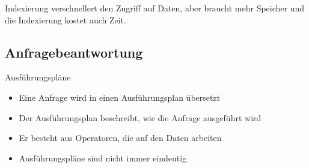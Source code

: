 \documentclass{article}
\begin{document}
Indexierung verschnellert den Zugriff auf Daten, aber braucht mehr Speicher und die Indexierung kostet auch Zeit.

\subsection*{Anfragebeantwortung}

\begin{block}{Ausführungspläne}
  \begin{itemize}
    \item Eine Anfrage wird in einen Ausführungsplan übersetzt
    \item Der Ausführungsplan beschreibt, wie die Anfrage ausgeführt wird
    \item Er besteht aus Operatoren, die auf den Daten arbeiten
    \item Ausführungspläne sind nicht immer eindeutig
  \end{itemize}
\end{block}
\end{document}
